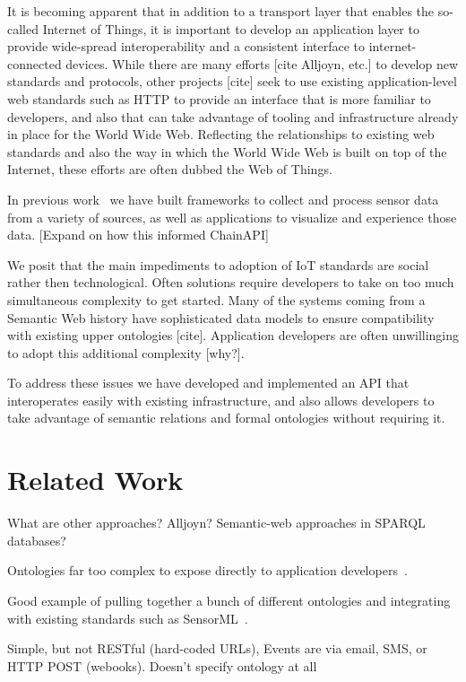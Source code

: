 \documentclass{acm_proc_article-sp}
\begin{document}
It is becoming apparent that in addition to a transport layer that enables the
so-called Internet of Things, it is important to develop an application layer
to provide wide-spread interoperability and a consistent interface to
internet-connected devices. While there are many efforts [cite Alljoyn, etc.]
to develop new standards and protocols, other projects [cite] seek to use
existing application-level web standards such as HTTP to provide an interface
that is more familiar to developers, and also that can take advantage of
tooling and infrastructure already in place for the World Wide Web. Reflecting
the relationships to existing web standards and also the way in which the World
Wide Web is built on top of the Internet, these efforts are often dubbed the
Web of Things.

In previous work~\cite{doppellab}\cite{gestures} we have built frameworks to collect
and process sensor data from a variety of sources, as well as applications to
visualize and experience those data. [Expand on how this informed ChainAPI]

We posit that the main impediments to adoption of IoT standards are social
rather then technological. Often solutions require developers to take on too much
simultaneous complexity to get started. Many of the systems coming from a Semantic
Web history have sophisticated data models to ensure compatibility with existing
upper ontologies [cite]. Application developers are often unwillinging to adopt
this additional complexity [why?].

To address these issues we have developed and implemented an API that interoperates
easily with existing infrastructure, and also allows developers to take advantage
of semantic relations and formal ontologies without requiring it.

\section{Related Work}

What are other approaches? Alljoyn? Semantic-web approaches in SPARQL
databases?

Ontologies far too complex to expose directly to application
developers~\cite{w3contology}.

Good example of pulling together a bunch of different ontologies and integrating
with existing standards such as SensorML~\cite{russomanno2005}.

Simple, but not RESTful (hard-coded URLs), Events are via email, SMS, or HTTP
POST (webooks). Doesn't specify ontology at all~\cite{gupta2010}
\end{document}
